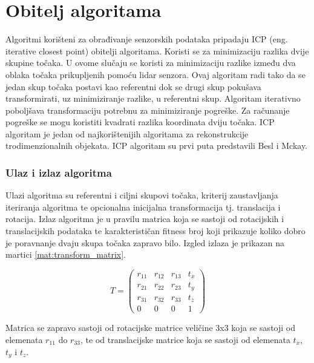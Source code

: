 \section{Obitelj algoritama}

Algoritmi korišteni za obrađivanje senzorskih podataka pripadaju ICP\cite{wiki:Iterative_closest_point} (eng. iterative closest point) obitelji algoritama. Koristi se za minimizaciju razlika dvije skupine točaka. U ovome slučaju se koristi za minimizaciju razlike između dva oblaka točaka prikupljenih pomoću lidar senzora. Ovaj algoritam radi tako da se jedan skup točaka postavi kao referentni dok se drugi skup pokušava transformirati, uz minimiziranje razlike, u referentni skup. Algoritam iterativno poboljšava transformaciju potrebnu za minimiziranje pogreške. Za računanje pogreške se mogu koristiti kvadrati razlika koordinata dviju točaka. ICP algoritam je jedan od najkorištenijih algoritama za rekonstrukcije trodimenzionalnih objekata. ICP algoritam su prvi puta predstavili Besl i Mckay\cite{beslmckay121791}.

\subsubsection{Ulaz i izlaz algoritma}

Ulazi algoritma su referentni i ciljni skupovi točaka, kriterij zaustavljanja iteriranja algoritma te opcionalna inicijalna transformacija tj. translacija i rotacija. Izlaz algoritma je u pravilu matrica koja se sastoji od rotacijskih i translacijskih podataka te karakterističan fitness broj koji prikazuje koliko dobro je poravnanje dvaju skupa točaka zapravo bilo. Izgled izlaza je prikazan na martici \ref{mat:transform_matrix}.

\begin{equation}
  T =
  \begin{pmatrix}
    r_{11} & r_{12} & r_{13} & t_{x}\\
    r_{21} & r_{22} & r_{23} & t_{y}\\
    r_{31} & r_{32} & r_{33} & t_{z}\\
    0      & 0      & 0      & 1
  \end{pmatrix}
  \label{mat:transform_matrix}
\end{equation}

Matrica se zapravo sastoji od rotacijske matrice veličine 3x3 koja se sastoji od elemenata $r_{11}$ do $r_{33}$, te od translacijske matrice koja se sastoji od elemenata $t_{x}$, $t_{y}$ i $t_{z}$. 

